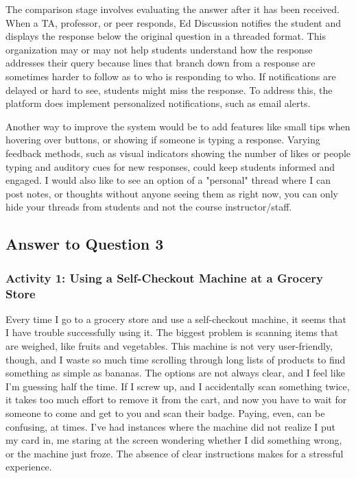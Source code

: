\documentclass[
	letterpaper, %
]{jdf}
\begin{document}
The comparison stage involves evaluating the answer after it has been received. When a TA, professor, or peer responds, Ed Discussion notifies the student and displays the response below the original question in a threaded format. This organization may or may not help students understand how the response addresses their query because lines that branch down from a response are sometimes harder to follow as to who is responding to who. If notifications are delayed or hard to see, students might miss the response. To address this, the platform does implement personalized notifications, such as email alerts.

Another way to improve the system would be to add features like small tips when hovering over buttons, or showing if someone is typing a response. Varying feedback methods, such as visual indicators showing the number of likes or people typing and auditory cues for new responses, could keep students informed and engaged. I would also like to see an option of a "personal" thread where I can post notes, or thoughts without anyone seeing them as right now, you can only hide your threads from students and not the course instructor/staff. 
\newpage

\subsection{Answer to Question 3}
\subsubsection {Activity 1: Using a Self-Checkout Machine at a Grocery Store}
Every time I go to a grocery store and use a self-checkout machine, it seems that I have trouble successfully using it. The biggest problem is scanning items that are weighed, like fruits and vegetables. This machine is not very user-friendly, though, and I waste so much time scrolling through long lists of products to find something as simple as bananas. The options are not always clear, and I feel like I’m guessing half the time. If I screw up, and I accidentally scan something twice, it takes too much effort to remove it from the cart, and now you have to wait for someone to come and get to you and scan their badge. Paying, even, can be confusing, at times. I’ve had instances where the machine did not realize I put my card in, me staring at the screen wondering whether I did something wrong, or the machine just froze. The absence of clear instructions makes for a stressful experience.
\end{document}
